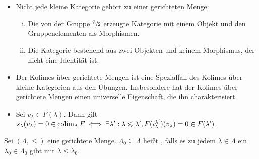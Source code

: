 \begin{bemerkung}
	\leavevmode
	\begin{itemize}
		\item Nicht jede kleine Kategorie gehört zu einer gerichteten Menge:
		\begin{enumerate}[(i)]
			\item Die von der Gruppe $\sfrac{\mathbb{Z}}{2}$ erzeugte Kategorie mit einem Objekt und den Gruppenelementen als Morphismen.
			\item Die Kategorie bestehend aus zwei Objekten und keinem Morphismus, der nicht eine Identität ist.
		\end{enumerate}
		\item Der Kolimes über gerichtete Mengen ist eine Spezialfall des Kolimes über kleine Kategorien aus den Übungen. 
		Insbesondere hat der Kolimes über gerichtete Mengen einen universelle Eigenschaft, die ihn charakterisiert.
		\item Sei $v_\lambda \in F(\lambda)$. Dann gilt
		\(
			s_\lambda(v_\lambda) =0 \in \operatorname*{colim}_\Lambda F \iff \exists \lambda' : \lambda \leqslant \lambda', F(i_\lambda^{\lambda'})(v_\lambda)=0 \in F(\lambda')
		\).
	\end{itemize}
\end{bemerkung}

\begin{definition}[{name=[kofinal]}]
	Sei $(\Lambda,\le)$ eine gerichtete Menge. $\Lambda_0 \subseteq \Lambda$ heißt , falls es zu jedem $\lambda \in \Lambda$ ein $\lambda_0 \in \Lambda_0$ gibt mit $\lambda\le \lambda_0$.
\end{definition}

